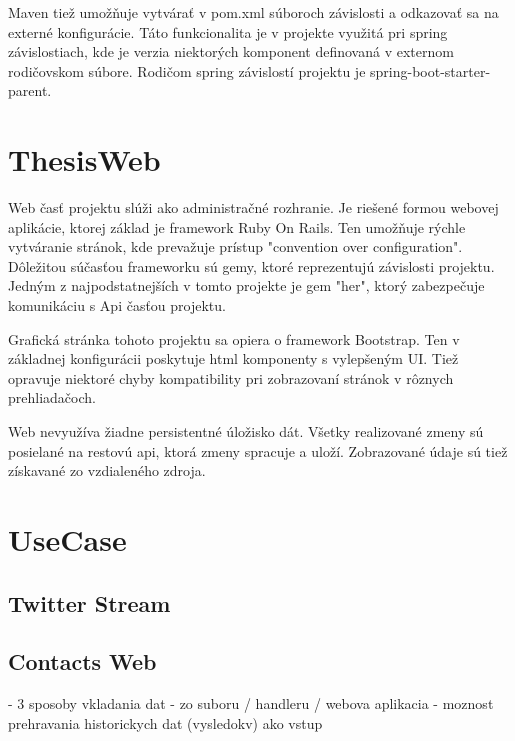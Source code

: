 		Maven tiež umožňuje vytvárať v pom.xml súboroch závislosti a odkazovať sa na externé konfigurácie. Táto funkcionalita je v projekte využitá pri spring závislostiach, kde je verzia niektorých komponent definovaná v externom rodičovskom súbore. Rodičom spring závislostí projektu je spring-boot-starter-parent.
		

\section{ThesisWeb}
	Web časť projektu slúži ako administračné rozhranie. Je riešené formou webovej aplikácie, ktorej základ je framework Ruby On Rails. Ten umožňuje rýchle vytváranie stránok, kde prevažuje prístup "convention over configuration". Dôležitou súčasťou frameworku sú gemy, ktoré reprezentujú závislosti projektu. Jedným z najpodstatnejších v tomto projekte je gem "her", ktorý zabezpečuje komunikáciu s Api časťou projektu.
	
	Grafická stránka tohoto projektu sa opiera o framework Bootstrap. Ten v základnej konfigurácii poskytuje html komponenty s vylepšeným UI. Tiež opravuje niektoré chyby kompatibility pri zobrazovaní stránok v rôznych prehliadačoch.
	
	Web nevyužíva žiadne persistentné úložisko dát. Všetky realizované zmeny sú posielané na restovú api, ktorá zmeny spracuje a uloží. Zobrazované údaje sú tiež získavané zo vzdialeného zdroja.
		
\section{UseCase}
	
	\subsection{Twitter Stream}
	\subsection{Contacts Web}
		
- 3 sposoby vkladania dat - zo suboru / handleru / webova aplikacia
- moznost prehravania historickych dat (vysledokv) ako vstup